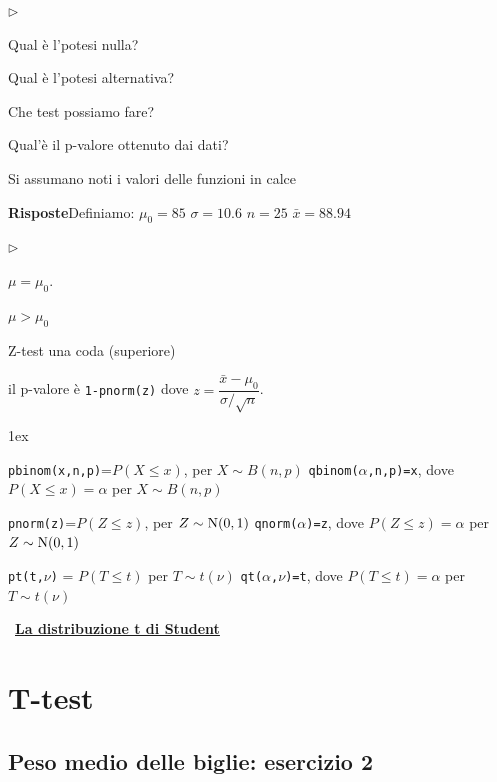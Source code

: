 \documentclass[11pt,openany]{book}
\newcommand{\mylabel}[1]{{\footnotesize\textsf{#1}}\hfill}
\renewenvironment{itemize}
  {\begin{list}{$\triangleright$}{%
   \setlength{\parskip}{0mm}
   \setlength{\topsep}{.2\baselineskip}
   \setlength{\rightmargin}{0mm}
   \setlength{\listparindent}{0mm}
   \setlength{\itemindent}{0mm}
   \setlength{\labelwidth}{3ex}
   \setlength{\itemsep}{.4\baselineskip}
   \setlength{\parsep}{0mm}
   \setlength{\partopsep}{0mm}
   \setlength{\labelsep}{1ex}
   \setlength{\leftmargin}{\labelwidth+\labelsep}
   \let\makelabel\mylabel}}{%
   \end{list}\vspace*{-1.3mm}}
\begin{document}
\begin{itemize}
\item[1.] Qual è l'potesi nulla?

\item[2.] Qual è l'potesi alternativa?

\item[3.] Che test possiamo fare?

\item[4.] Qual'è il p-valore ottenuto dai dati?
\end{itemize}

Si assumano noti i valori delle funzioni in calce

\textbf{Risposte}\quad Definiamo:\quad
$\mu_0=85$\quad
$\sigma=10.6$\quad
$n=25$\quad
$\bar x=88.94$
\begin{itemize}
\item[1.] $\mu=\mu_0$.
\item[2.] $\mu>\mu_0$ 
\item[3.] Z-test una coda (superiore)
\item[4.] il p-valore è {\tt 1-pnorm(z)} dove $z=\dfrac{\bar x-\mu_0}{\sigma/\sqrt{n}}$.
\end{itemize}

\vfill
\parskip1ex
{\hrulefill\scriptsize


{\tt pbinom(x,n,p)}=$P(X\le x)$, per $X\sim B(n,p)$
\hfill 
{\tt qbinom($\alpha$,n,p)=x},  dove $P(X\le x)=\alpha$ per $X\sim B(n,p)$

{\tt pnorm(z)}=$P(Z\le z)$, per $Z\sim {\rm N}(0,1)$
\hfill 
{\tt qnorm($\alpha$)=z},  dove $P(Z\le z)=\alpha$ per $Z\sim {\rm N}(0,1)$

{\tt pt(t,$\nu$)} = $P(T\le t)$ per $T\sim t(\nu)$
\hfill
{\tt qt($\alpha$,$\nu$)=t}, dove $P(T\le t)=\alpha$ per $T\sim t(\nu)$

}



\clearpage\ 
\hfill\textbf{{\color{brown}\hyperref[tStudent]{La distribuzione t di Student \faShare}}}
\section{T-test}
\label{T-test}

\subsection{Peso medio delle biglie: esercizio 2}
\end{document}

